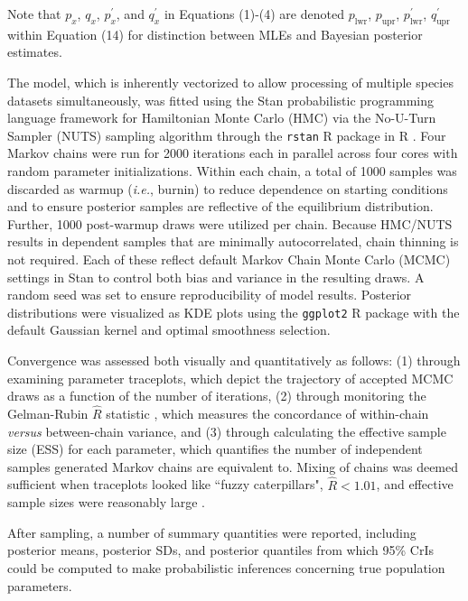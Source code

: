 \documentclass[12pt]{article}
\begin{document}
\noindent Note that $p_x$, $q_x$, $p^{'}_x$, and $q^{'}_x$ in Equations (1)-(4) are denoted $p_\mathrm{lwr}$, $p_\mathrm{upr}$, $p^{'}_\mathrm{lwr}$, $q^{'}_\mathrm{upr}$ within Equation (14) for distinction between MLEs and Bayesian posterior estimates.

The model, which is inherently vectorized to allow processing of multiple species datasets simultaneously, was fitted using the Stan probabilistic programming language \citep{carpenter2017stan} framework for Hamiltonian Monte Carlo (HMC) via the No-U-Turn Sampler (NUTS) sampling algorithm \citep{hoffman2014no} through the {\tt rstan} R package \citep{stan2023rstan} in R \citep{rcore2024language}. Four Markov chains were run for 2000 iterations each in parallel across four cores with random parameter initializations. Within each chain, a total of 1000 samples was discarded as warmup (\textit{i.e.}, burnin) to reduce dependence on starting conditions and to ensure posterior samples are reflective of the equilibrium distribution. Further, 1000 post-warmup draws were utilized per chain. Because HMC/NUTS results in dependent samples that are minimally autocorrelated, chain thinning is not required. Each of these reflect default Markov Chain Monte Carlo (MCMC) settings in Stan to control both bias and variance in the resulting draws. A random seed was set to ensure reproducibility of model results. Posterior distributions were visualized as KDE plots using the {\tt ggplot2} R package \citep{wickham2016ggplot2} with the default Gaussian kernel and optimal smoothness selection.




Convergence was assessed both visually and quantitatively as follows: (1) through \\ examining parameter traceplots, which depict the trajectory of accepted MCMC draws as a function of the number of iterations, (2) through monitoring the Gelman-Rubin $\hat{R}$ statistic \citep{gelman1992iterative, vehtari2017rank}, which measures the concordance of within-chain \textit{versus} between-chain variance, and (3) through calculating the effective sample size (ESS) for each parameter, which quantifies the number of independent samples generated Markov chains are equivalent to. Mixing of chains was deemed sufficient when traceplots looked like ``fuzzy caterpillars", $\hat{R} < 1.01$, and effective sample sizes were reasonably large \citep{gelman2020bayesian}.

After sampling, a number of summary quantities were reported, including posterior means, posterior SDs, and posterior quantiles from which 95\% CrIs could be computed to make probabilistic inferences concerning true population parameters.
\end{document}
